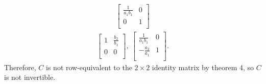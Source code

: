 \documentclass[12pt]{article}
\begin{document}
\begin{enumerate}
\begin{align*}
\begin{bmatrix}
        \frac{1}{a_1b_1} & 0\\
        0 & 1\\
      \end{bmatrix}
    \end{align*}
    \begin{align*}
      \begin{bmatrix}
        1 & \frac{b_2}{b_1}\\
        0 & 0\\
      \end{bmatrix},\
      \begin{bmatrix}
        \frac{1}{a_1b_1} & 0\\
        -\frac{a_2}{a_1} & 1\\
      \end{bmatrix}.
    \end{align*}
    Therefore, $C$ is not row-equivalent to the $2 \times 2$
    identity matrix by theorem 4, so $C$ is not invertible.
\end{enumerate}
\end{document}
